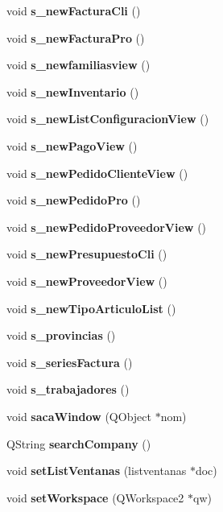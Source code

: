 \begin{CompactItemize}
\item 
void {\bf s\_\-new\-Factura\-Cli} ()
\item 
void {\bf s\_\-new\-Factura\-Pro} ()\label{classcompany_a53}

\item 
void {\bf s\_\-newfamiliasview} ()\label{classcompany_a54}

\item 
void {\bf s\_\-new\-Inventario} ()\label{classcompany_a55}

\item 
void {\bf s\_\-new\-List\-Configuracion\-View} ()\label{classcompany_a56}

\item 
void {\bf s\_\-new\-Pago\-View} ()\label{classcompany_a57}

\item 
void {\bf s\_\-new\-Pedido\-Cliente\-View} ()\label{classcompany_a58}

\item 
void {\bf s\_\-new\-Pedido\-Pro} ()\label{classcompany_a59}

\item 
void {\bf s\_\-new\-Pedido\-Proveedor\-View} ()\label{classcompany_a60}

\item 
void {\bf s\_\-new\-Presupuesto\-Cli} ()
\item 
void {\bf s\_\-new\-Proveedor\-View} ()\label{classcompany_a62}

\item 
void {\bf s\_\-new\-Tipo\-Articulo\-List} ()\label{classcompany_a63}

\item 
void {\bf s\_\-provincias} ()\label{classcompany_a64}

\item 
void {\bf s\_\-series\-Factura} ()\label{classcompany_a65}

\item 
void {\bf s\_\-trabajadores} ()\label{classcompany_a66}

\item 
void {\bf saca\-Window} (QObject $\ast$nom)\label{classcompany_a67}

\item 
QString {\bf search\-Company} ()
\item 
void {\bf set\-List\-Ventanas} (listventanas $\ast$doc)\label{classcompany_a69}

\item 
void {\bf set\-Workspace} (QWorkspace2 $\ast$qw)\label{classcompany_a70}


\end{CompactItemize}
